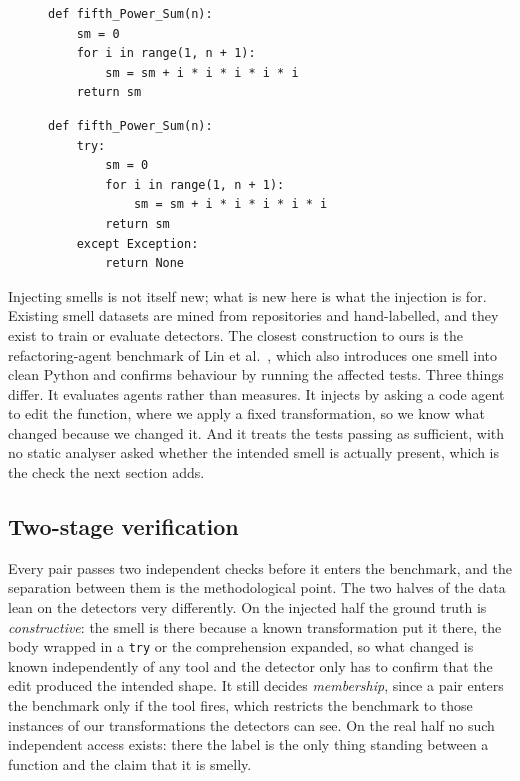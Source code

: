 \documentclass[10pt,a4paper,twocolumn]{article}
\begin{document}
\begin{figure}[!t]
  \centering
  \begin{minipage}[t]{0.46\textwidth}
\begin{lstlisting}
def fifth_Power_Sum(n):
    sm = 0
    for i in range(1, n + 1):
        sm = sm + i * i * i * i * i
    return sm
\end{lstlisting}
  \end{minipage}\hfill
  \begin{minipage}[t]{0.46\textwidth}
\begin{lstlisting}
def fifth_Power_Sum(n):
    try:
        sm = 0
        for i in range(1, n + 1):
            sm = sm + i * i * i * i * i
        return sm
    except Exception:
        return None
\end{lstlisting}
  \end{minipage}
  \label{lst:inject}
\end{figure}

Injecting smells is not itself new; what is new here is what the injection is
for. Existing smell datasets are mined from repositories and hand-labelled, and
they exist to train or evaluate detectors. The closest construction to
ours is the refactoring-agent benchmark of Lin et al.\ \cite{lin2026smellbench},
which also introduces one smell into clean Python and confirms behaviour by
running the affected tests. Three things differ. It evaluates agents rather than
measures. It injects by asking a code agent to edit the function, where we apply
a fixed transformation, so we know what changed because we changed it. And it
treats the tests passing as sufficient, with no static analyser asked whether
the intended smell is actually present, which is the check the next section
adds.

\subsection{Two-stage verification}
\label{sec:verification}

Every pair passes two independent checks before it enters the benchmark, and the separation between them is the methodological point. The two halves
of the data lean on the detectors very differently. On the injected
half the ground truth is \emph{constructive}: the smell is there because a known
transformation put it there, the body wrapped in a \texttt{try} or the
comprehension expanded, so what changed is known independently of any tool and the
detector only has to confirm that the edit produced the intended shape. It still
decides \emph{membership}, since a pair enters the benchmark only if the tool
fires, which restricts the benchmark to those instances of our transformations the
detectors can see. On the real half no such independent access exists: there the
label is the only thing standing between a function and the claim that it is
smelly.
\end{document}
